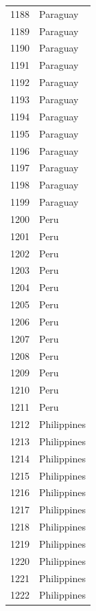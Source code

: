 \documentclass[
  letterpaper,
  DIV=11,
  numbers=noendperiod]{scrreprt}
\begin{document}
\begin{tabular}{ll}
1188 &                  Paraguay \\
1189 &                  Paraguay \\
1190 &                  Paraguay \\
1191 &                  Paraguay \\
1192 &                  Paraguay \\
1193 &                  Paraguay \\
1194 &                  Paraguay \\
1195 &                  Paraguay \\
1196 &                  Paraguay \\
1197 &                  Paraguay \\
1198 &                  Paraguay \\
1199 &                  Paraguay \\
1200 &                      Peru \\
1201 &                      Peru \\
1202 &                      Peru \\
1203 &                      Peru \\
1204 &                      Peru \\
1205 &                      Peru \\
1206 &                      Peru \\
1207 &                      Peru \\
1208 &                      Peru \\
1209 &                      Peru \\
1210 &                      Peru \\
1211 &                      Peru \\
1212 &               Philippines \\
1213 &               Philippines \\
1214 &               Philippines \\
1215 &               Philippines \\
1216 &               Philippines \\
1217 &               Philippines \\
1218 &               Philippines \\
1219 &               Philippines \\
1220 &               Philippines \\
1221 &               Philippines \\
1222 &               Philippines \\

\end{tabular}
\end{document}
